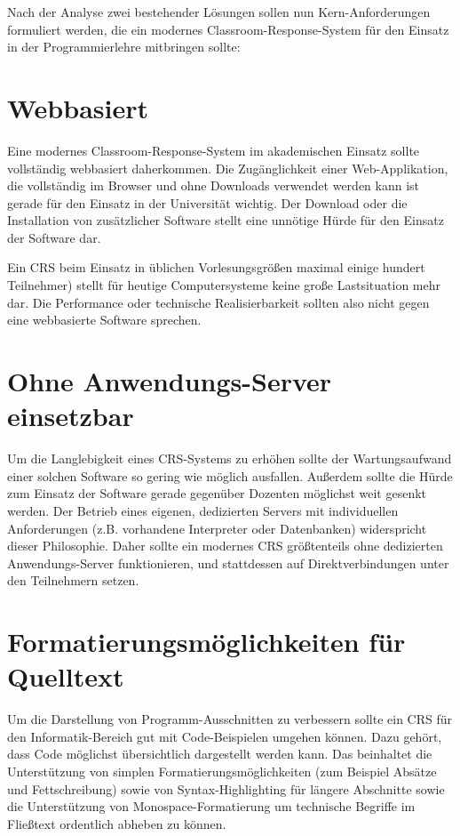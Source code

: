 Nach der Analyse zwei bestehender Lösungen sollen nun Kern-Anforderungen formuliert werden, die ein modernes Classroom-Response-System für den Einsatz in der Programmierlehre mitbringen sollte:

\section{Webbasiert}
\label{chap:webbasiert}
Eine modernes Classroom-Response-System im akademischen Einsatz sollte vollständig webbasiert daherkommen. Die Zugänglichkeit einer Web-Applikation, die vollständig im Browser und ohne Downloads verwendet werden kann ist gerade für den Einsatz in der Universität wichtig. Der Download oder die Installation von zusätzlicher Software stellt eine unnötige Hürde für den Einsatz der Software dar.

Ein CRS beim Einsatz in üblichen Vorlesungsgrößen maximal einige hundert Teilnehmer) stellt für heutige Computersysteme keine große Lastsituation mehr dar. Die Performance oder technische Realisierbarkeit sollten also nicht gegen eine webbasierte Software sprechen.

\section{Ohne Anwendungs-Server einsetzbar}
\label{chap:anforderung_p2p}
Um die Langlebigkeit eines CRS-Systems zu erhöhen sollte der Wartungsaufwand einer solchen Software so gering wie möglich ausfallen. Außerdem sollte die Hürde zum Einsatz der Software gerade gegenüber Dozenten möglichst weit gesenkt werden. Der Betrieb eines eigenen, dedizierten Servers mit individuellen Anforderungen (z.B. vorhandene Interpreter oder Datenbanken) widerspricht dieser Philosophie. Daher sollte ein modernes CRS größtenteils ohne dedizierten Anwendungs-Server funktionieren, und stattdessen auf Direktverbindungen unter den Teilnehmern setzen.

\section{Formatierungsmöglichkeiten für Quelltext}
\label{chap:codeformatierung}
Um die Darstellung von Programm-Ausschnitten zu verbessern sollte ein CRS für den Informatik-Bereich gut mit Code-Beispielen umgehen können. Dazu gehört, dass Code möglichst übersichtlich dargestellt werden kann. Das beinhaltet die Unterstützung von simplen Formatierungsmöglichkeiten (zum Beispiel Absätze und Fettschreibung) sowie von Syntax-Highlighting für längere Abschnitte sowie die Unterstützung von Monospace-Formatierung um technische Begriffe im Fließtext ordentlich abheben zu können.

